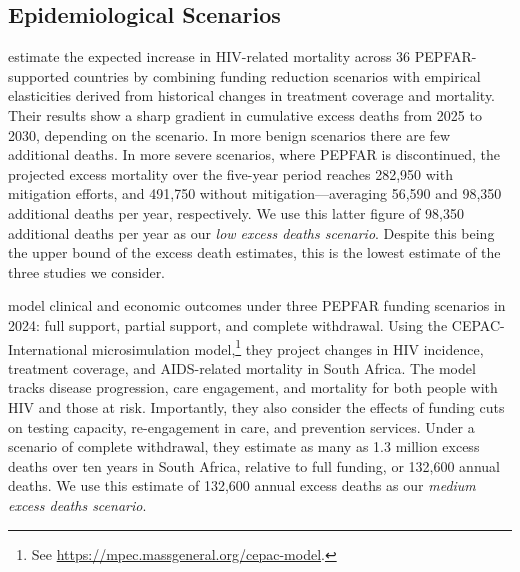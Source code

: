 \documentclass[letterpaper,12pt]{article}
\theoremstyle{definition}
\begin{document}
\begin{spacing}{1.5}
\subsection{Epidemiological Scenarios}

\citet{Brink2025} estimate the expected increase in HIV-related mortality across 36 PEPFAR-supported countries by combining funding reduction scenarios with empirical elasticities derived from historical changes in treatment coverage and mortality. Their results show a sharp gradient in cumulative excess deaths from 2025 to 2030, depending on the scenario. In more benign scenarios there are few additional deaths. In more severe scenarios, where PEPFAR is discontinued, the projected excess mortality over the five-year period reaches 282,950 with mitigation efforts, and 491,750 without mitigation—averaging 56,590 and 98,350 additional deaths per year, respectively. We use this latter figure of 98,350 additional deaths per year as our \textit{low excess deaths scenario}. Despite this being the upper bound of the \citet{Brink2025} excess death estimates, this is the lowest estimate of the three studies we consider.

\citet{Gandhi2025} model clinical and economic outcomes under three PEPFAR funding scenarios in 2024: full support, partial support, and complete withdrawal. Using the CEPAC-International microsimulation model,\footnote{See \href{https://mpec.massgeneral.org/cepac-model}{https://mpec.massgeneral.org/cepac-model}.} they project changes in HIV incidence, treatment coverage, and AIDS-related mortality in South Africa. The model tracks disease progression, care engagement, and mortality for both people with HIV and those at risk. Importantly, they also consider the effects of funding cuts on testing capacity, re-engagement in care, and prevention services. Under a scenario of complete withdrawal, they estimate as many as \num{1.3} million excess deaths over ten years in South Africa, relative to full funding, or 132,600 annual deaths. We use this estimate of 132,600 annual excess deaths as our \textit{medium excess deaths scenario}.


\end{spacing}
\end{document}
